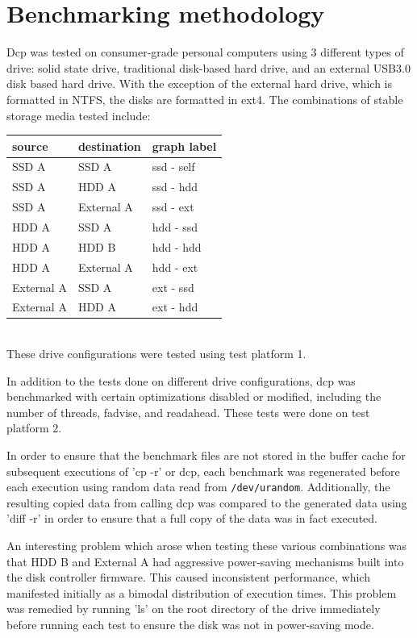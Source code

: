 \documentclass[12pt]{article}
\begin{document}
\section{Benchmarking methodology}
Dcp was tested on consumer-grade personal computers using 3 different types
of drive: solid state drive, traditional disk-based hard drive, and
an external USB3.0 disk based hard drive. With the exception of the external
hard drive, which is formatted in NTFS, the disks are formatted in ext4.
The combinations of stable storage media tested include:\\
\begin{tabular}{|l|l|l|}
  \hline
  source  & destination & graph label \\
  \hline
  SSD A   & SSD A       & ssd - self  \\
  SSD A   & HDD A       & ssd - hdd   \\
  SSD A   & External A  & ssd - ext   \\
  HDD A   & SSD A       & hdd - ssd   \\
  HDD A   & HDD B       & hdd - hdd   \\
  HDD A   & External A  & hdd - ext   \\
  External A & SSD A    & ext - ssd   \\
  External A & HDD A    & ext - hdd   \\
  \hline
\end{tabular} \\

These drive configurations were tested using test platform 1.

In addition to the tests done on different drive configurations,
dcp was benchmarked with certain optimizations disabled or modified, including
the number of threads, fadvise, and readahead. These tests were done on test platform 2.

In order to ensure that the benchmark files are not stored in the buffer cache
for subsequent executions of 'cp -r' or dcp, each benchmark was regenerated
before each execution using random data read from \texttt{/dev/urandom}.
Additionally, the resulting copied data from calling dcp
was compared to the generated data using 'diff -r' in order to
ensure that a full copy of the data was in fact executed.

An interesting problem which arose when testing these various combinations
was that HDD B and External A had aggressive power-saving mechanisms built into the
disk controller firmware. This caused inconsistent performance, which
manifested initially as a bimodal distribution of execution times. This
problem was remedied by running 'ls' on the root directory of the
drive immediately before running each test to ensure the disk was not in power-saving
mode.
\end{document}

